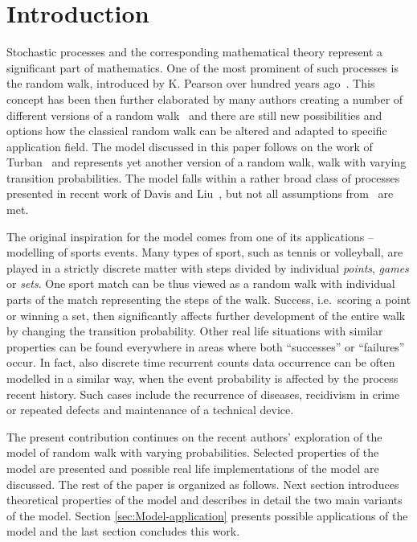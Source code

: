 \documentclass[runningheads]{CMSIM}
\begin{document}
    \section{Introduction}\label{sec:introduction}

    Stochastic processes and the corresponding mathematical theory represent
    a significant part of mathematics.
    One of the most prominent of such
    processes is the random walk, introduced by K. Pearson over hundred
    years ago~\cite{pearson1905problem}.
    This concept has been then further
    elaborated by many authors creating a number of different versions
    of a random walk~\cite{spitzer2013principles} and there are still
    new possibilities and options how the classical random walk can be
    altered and adapted to specific application field.
    The model discussed
    in this paper follows on the work of Turban~\cite{turban2010random}
    and represents yet another version of a random walk, walk with varying
    transition probabilities.
    The model falls within a rather broad class
    of processes presented in recent work of Davis and Liu~\cite{davis2012theory}, but not all assumptions from~\cite{davis2012theory} are met.

    The original inspiration for the model comes from one of its applications -- modelling of sports events.
    Many types of sport, such as tennis
    or volleyball, are played in a strictly discrete matter with steps
    divided by individual \emph{points},\emph{ games }or \emph{sets}.
    One sport match can be thus viewed as a random walk with individual
    parts of the match representing the steps of the walk.
    Success, i.e.\ scoring a point or winning a set, then significantly affects further
    development of the entire walk by changing the transition probability.
    Other real life situations with similar properties can be found everywhere
    in areas where both ``successes'' or ``failures'' occur.
    In fact,
    also discrete time recurrent counts data occurrence can be often modelled
    in a similar way, when the event probability is affected by the process
    recent history.
    Such cases include the recurrence of diseases, recidivism
    in crime or repeated defects and maintenance of a technical
    device.

    The present contribution continues on the recent authors' exploration
    of the model of random walk with varying probabilities.
    Selected
    properties of the model are presented and possible real life implementations
    of the model are discussed.
    The rest of the paper is organized as
    follows.
    Next section introduces theoretical properties of the model
    and describes in detail the two main variants of the model.
    Section \ref{sec:Model-application}
    presents possible applications of the model and the last section concludes
    this work.
\end{document}
